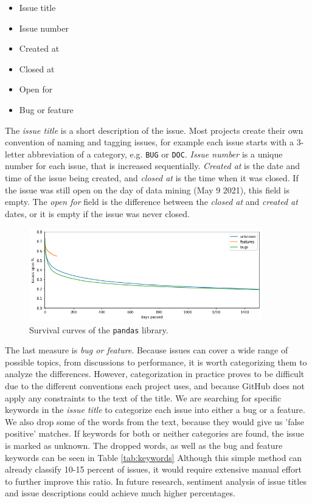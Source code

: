\begin{itemize}
    \item Issue title
    \item Issue number
    \item Created at
    \item Closed at
    \item Open for
    \item Bug or feature
\end{itemize}

The \textit{issue title} is a short description of the issue. Most projects create their own convention of naming and tagging issues, for example each issue starts with a 3-letter abbreviation of a category, e.g. \texttt{BUG} or \texttt{DOC}. \textit{Issue number} is a unique number for each issue, that is increased sequentially. \textit{Created at} is the date and time of the issue being created, and \textit{closed at} is the time when it was closed. If the issue was still open on the day of data mining (May 9 2021), this field is empty. The \textit{open for} field is the difference between the \textit{closed at} and \textit{created at} dates, or it is empty if the issue was never closed.

\begin{figure}
    \centering
    \includegraphics[width=0.9\textwidth]{figures/issues_open.png}
    \caption{Survival curves of the \texttt{pandas} library.}
    \label{fig:survival}
\end{figure}

The last measure is \textit{bug or feature}. Because issues can cover a wide range of possible topics, from discussions to performance, it is worth categorizing them to analyze the differences. However, categorization in practice proves to be difficult due to the different conventions each project uses, and because GitHub does not apply any constraints to the text of the title. We are searching for specific keywords in the \textit{issue title} to categorize each issue into either a bug or a feature. We also drop some of the words from the text, because they would give us 'false positive' matches. If keywords for both or neither categories are found, the issue is marked as unknown. The dropped words, as well as the bug and feature keywords can be seen in Table \ref{tab:keywords} Although this simple method can already classify 10-15 percent of issues, it would require extensive manual effort to further improve this ratio. In future research, sentiment analysis of issue titles and issue descriptions could achieve much higher percentages.

